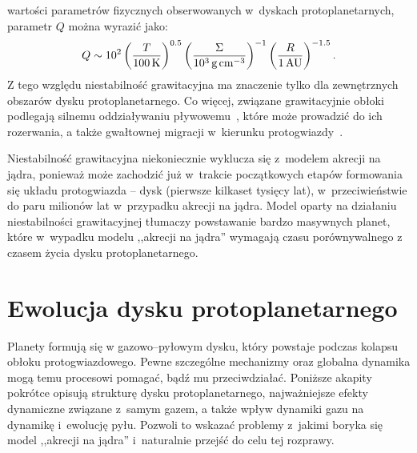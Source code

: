 wartości parametrów fizycznych obserwowanych w~dyskach protoplanetarnych,
parametr $Q$ można wyrazić jako:
%
\begin{equation}
   Q \sim 10^2 
   \left(\frac{T}{100\hbox{$\thinspace\textrm{K}$}}\right)^{0.5}
   \left(\frac{\Sigma}{10^3\hbox{$\thinspace\textrm{g}$}\hbox{$\thinspace\textrm{cm}$}^{-3}}\right)^{-1}
   \left(\frac{R}{1\hbox{$\thinspace\textrm{AU}$}}\right)^{-1.5}.
   \label{eq:Qemp}
\end{equation}
%
Z tego względu niestabilność grawitacyjna ma znaczenie tylko dla zewnętrznych
obszarów dysku protoplanetarnego. Co więcej, związane grawitacyjnie obłoki
podlegają silnemu oddziaływaniu pływowemu~\cite{VH12}, które może prowadzić do
ich rozerwania, a także gwałtownej migracji w~kierunku protogwiazdy~\cite{BMP11}.
\par Niestabilność grawitacyjna niekoniecznie wyklucza się z~modelem akrecji na
jądra, ponieważ może zachodzić już w~trakcie początkowych etapów formowania się
układu protogwiazda -- dysk (pierwsze kilkaset tysięcy lat), w~przeciwieństwie
do paru milionów lat w~przypadku akrecji na jądra. Model oparty na działaniu
niestabilności grawitacyjnej tłumaczy powstawanie bardzo masywnych planet, które
w~wypadku modelu ,,akrecji na jądra'' wymagają czasu porównywalnego z czasem
życia dysku protoplanetarnego\cite{HBP13}.

\section{Ewolucja dysku protoplanetarnego}
Planety formują się w gazowo--pyłowym dysku, który powstaje podczas kolapsu
obłoku protogwiazdowego. Pewne szczególne mechanizmy oraz globalna dynamika mogą
temu procesowi pomagać, bądź mu przeciwdziałać. Poniższe akapity pokrótce
opisują strukturę dysku protoplanetarnego, najważniejsze efekty dynamiczne
związane z~samym gazem, a także wpływ dynamiki gazu na dynamikę
i~ewolucję pyłu. Pozwoli to wskazać problemy z~jakimi boryka się model ,,akrecji
na jądra'' i~naturalnie przejść do celu tej rozprawy.

